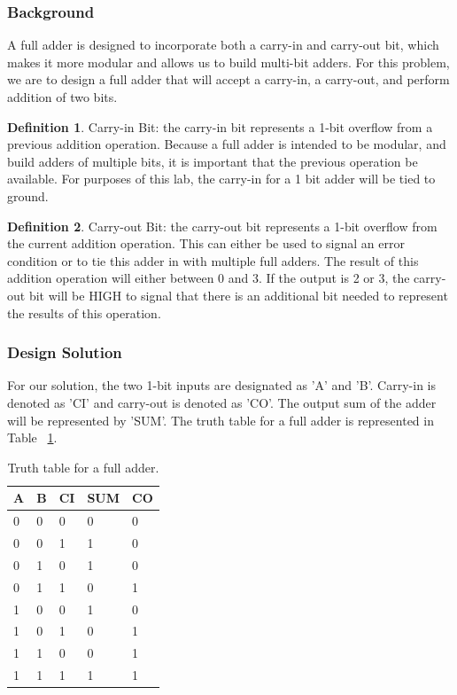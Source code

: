 \documentclass[11pt]{article}
\begin{document}
\subsubsection{Background}

A full adder is designed to incorporate both a carry-in and carry-out bit, which makes it more modular and allows us to build multi-bit adders. For this problem, we are to design a full adder that will accept a carry-in, a carry-out, and perform addition of two bits.

\theoremstyle{definition}
\newtheorem{definition}{Definition}
\begin{definition}
Carry-in Bit: the carry-in bit represents a 1-bit overflow from a previous addition operation. Because a full adder is intended to be modular, and build adders of multiple bits, it is important that the previous operation be available. For purposes of this lab, the carry-in for a 1 bit adder will be tied to ground.
\end{definition}

\begin{definition}
	Carry-out Bit: the carry-out bit represents a 1-bit overflow from the current addition operation. This can either be used to signal an error condition or to tie this adder in with multiple full adders. The result of this addition operation will either between 0 and 3. If the output is 2 or 3, the carry-out bit will be HIGH to signal that there is an additional bit needed to represent the results of this operation.
\end{definition}

\subsubsection{Design Solution}

For our solution, the two 1-bit inputs are designated as 'A' and 'B'. Carry-in is denoted as 'CI' and carry-out is denoted as 'CO'. The output sum of the adder will be represented by 'SUM'. The truth table for a full adder is represented in Table ~\ref{tab:fullAddTruthTable}.

\begin{table}[h]
\begin{center}
	\begin{tabular}{| l | l | l | l | l |}
		\hline
		A & B & CI & SUM & CO \\ \hline
		0 & 0 & 0 & 0 & 0 \\ \hline
		0 & 0 & 1 & 1 & 0 \\ \hline
		0 & 1 & 0 & 1 & 0 \\ \hline
		0 & 1 & 1 & 0 & 1 \\ \hline
		1 & 0 & 0 & 1 & 0 \\ \hline
		1 & 0 & 1 & 0 & 1 \\ \hline
		1 & 1 & 0 & 0 & 1 \\ \hline
		1 & 1 & 1 & 1 & 1 \\ \hline
	\end{tabular}
	\caption{\label{tab:fullAddTruthTable}Truth table for a full adder.}
	\label{tab:fullAddTruthTable}
\end{center}
\end{table}
\end{document}

